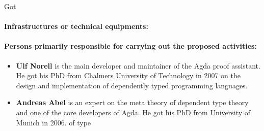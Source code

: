 \begin{sitedescription}{Got}
\paragraph*{Infrastructures or technical equipments:}

\paragraph*{Persons primarily responsible for carrying out the proposed activities:}

\begin{itemize}
\item{\bf Ulf Norell} is the main developer and maintainer of the Agda
proof assistant. He got his PhD from Chalmers University of Technology in
2007 on the design and implementation of dependently typed programming
languages.
\item{\bf Andreas Abel} is an expert on the meta theory of dependent type
theory and one of the core developers of Agda. He got his PhD from
University of Munich in 2006.
of type
\end{itemize}

\end{sitedescription}

